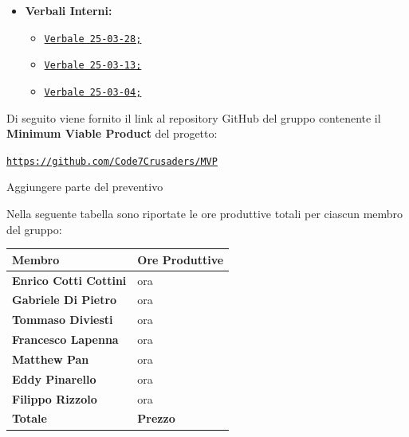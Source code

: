 \documentclass{article}
\begin{document}
\begin{itemize}
        \item \textbf{Verbali Interni:}
        \begin{itemize}
            \item \href{https://code7crusaders.github.io/docs/PB/verbale_esterno/verbale_25-03-28.html}{\texttt{Verbale 25-03-28;}}
            \item \href{https://code7crusaders.github.io/docs/PB/verbale_esterno/verbale_25-03-13.html}{\texttt{Verbale 25-03-13;}}
            \item \href{https://code7crusaders.github.io/docs/PB/verbale_esterno/verbale_25-03-04.html}{\texttt{Verbale 25-03-04;}}
        \end{itemize}
\end{itemize}

Di seguito viene fornito il link al repository GitHub del gruppo contenente il \textbf{Minimum Viable Product} del progetto:
\begin{center}
    \texttt{\url{https://github.com/Code7Crusaders/MVP}}
\end{center}

Aggiungere parte del preventivo %

Nella seguente tabella sono riportate le ore produttive totali per ciascun membro del gruppo:
\begin{table}[h]
    \centering
    \renewcommand{\arraystretch}{1.5} %
    \begin{tabular}{| >{\centering\arraybackslash}m{6cm} | >{\centering\arraybackslash}m{4cm} |} %
        \hline
        \textbf{Membro} & \textbf{Ore Produttive} \\
        \hline
        \textbf{Enrico Cotti Cottini} & ora \\ 
        \textbf{Gabriele Di Pietro} & ora \\ 
        \textbf{Tommaso Diviesti} & ora \\ 
        \textbf{Francesco Lapenna} & ora \\ 
        \textbf{Matthew Pan} & ora \\ 
        \textbf{Eddy Pinarello} & ora \\ 
        \textbf{Filippo Rizzolo} & ora \\ 
        \hline
        \textbf{Totale} & \textbf{Prezzo} \\
        \hline
    \end{tabular}
    \label{tab:membri}
\end{table}
\end{document}
